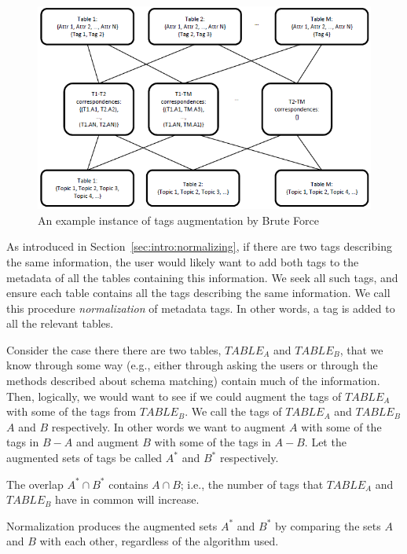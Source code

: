 \begin{figure}
    \centering
    \includegraphics[width=5in]{figures/an-example-instance-brute-force.png}
    \caption{An example instance of tags augmentation by Brute Force}
    \label{fig:an-example-instance-brute-force}
\end{figure}

As introduced in Section~\ref{sec:intro:normalizing}, if there are two tags describing the same information, the user 
would likely want to add both tags to the metadata of all the tables containing this information. We seek all such tags, and ensure each table contains all the tags describing
the same information. We call this procedure \textit{normalization} of metadata tags. In
other words, a tag is added to all the relevant tables.


Consider the case there there are two tables, $TABLE_A$ and $TABLE_B$, that we know through some way (e.g., either through asking the users or through the methods described about schema matching) contain much of the information. Then, logically, we would want to see if we could augment the tags of $TABLE_A$ with some of the tags from $TABLE_B$. We call the tags of $TABLE_A$ and $TABLE_B$ $A$ and $B$ respectively. In other words we want to augment $A$ with some of the tags in $B-A$ and augment $B$ with some of the tags in $A-B$. Let the augmented sets of tags be called $A^{*}$ and $B^{*}$ respectively.

The overlap $A^{*}\cap B^{*}$ contains $A\cap B$; i.e., the number of tags that $TABLE_A$ and $TABLE_B$ have in common will increase. 

Normalization produces the augmented sets $A^{*}$ and $B^{*}$ by comparing the sets $A$ and $B$ with each other, regardless of the algorithm used. 


